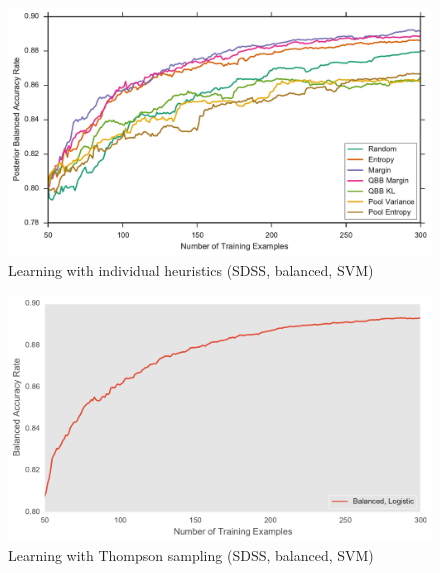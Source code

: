 \begin{figure}[p]
	\centering
	\includegraphics[width=\textwidth]{figures/5_active/sdss_ur_individuals}
	\caption[Learning with individual heuristics (SDSS, unbalanced, SVM)]{
		Learning with individual heuristics (SDSS, balanced, SVM)}
	\label{fig:sdss_ur_individuals}
\end{figure}

\begin{figure}[p]
	\centering
	\includegraphics[width=\textwidth]{figures/5_thompson/sdss_ur_thompson}
	\caption[Learning with Thompson sampling (SDSS, unbalanced, SVM)]{
		Learning with Thompson sampling (SDSS, balanced, SVM)}
	\label{fig:sdss_ur_thompson}
\end{figure}


